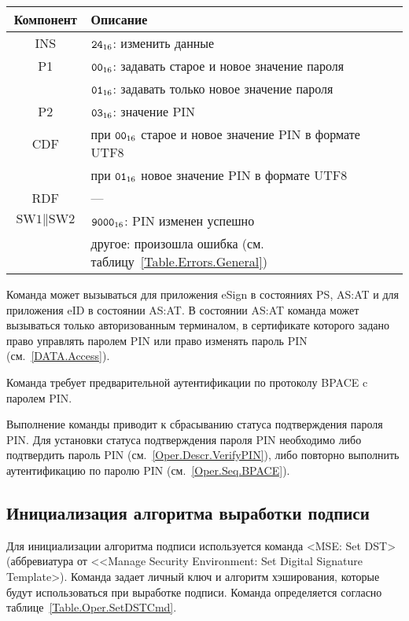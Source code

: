 \begin{table}[hbt]
\caption{}\label{Table.Oper.ChangePINCmd}
\begin{tabular}{|c|p{14cm}|}
\hline
Компонент & 	Описание \\
\hline
\hline
INS & $\texttt{24}_{16}$: изменить данные\\
\hline
P1 & $\texttt{00}_{16}$: задавать старое и новое значение пароля \\
   & $\texttt{01}_{16}$: задавать только новое значение пароля\\
\hline
P2 & $\texttt{03}_{16}$: значение PIN \\
\hline
CDF & при $\texttt{00}_{16}$ старое и новое значение PIN в формате UTF8\\
    & при $\texttt{01}_{16}$ новое значение PIN в формате UTF8\\
\hline 
RDF & 	 --- \\
\hline
$\text{SW1}\parallel\text{SW2}$ & 
 $\texttt{9000}_{16}$: PIN изменен успешно \\
  & другое: произошла ошибка (см. таблицу~\ref{Table.Errors.General})\\
\hline
\end{tabular}
\end{table}

Команда может вызываться для приложения eSign в состояниях 
PS, AS:AT и для приложения eID в состоянии AS:AT. 
В состоянии AS:AT команда может вызываться 
только авторизованным терминалом,
в сертификате которого задано право 
управлять паролем PIN или право изменять пароль 
PIN (см.~\ref{DATA.Access}).

Команда требует предварительной аутентификации по 
протоколу BPACE c паролем PIN. 

Выполнение команды приводит к сбрасыванию 
статуса подтверждения пароля PIN.
Для установки статуса подтверждения пароля PIN 
необходимо либо подтвердить пароль PIN (см.~\ref{Oper.Descr.VerifyPIN}), 
либо повторно выполнить аутентификацию по паролю PIN (см.~\ref{Oper.Seq.BPACE}).


\subsection{Инициализация алгоритма выработки подписи}
\label{Oper.Descr.SetDST}

Для инициализации алгоритма подписи используется команда     
<MSE: Set DST> (аббревиатура от <<Manage Security Environment: Set 
Digital Signature Template>).
Команда задает личный ключ и алгоритм
хэширования, которые будут использоваться при выработке подписи.
Команда определяется согласно таблице~\ref{Table.Oper.SetDSTCmd}.

